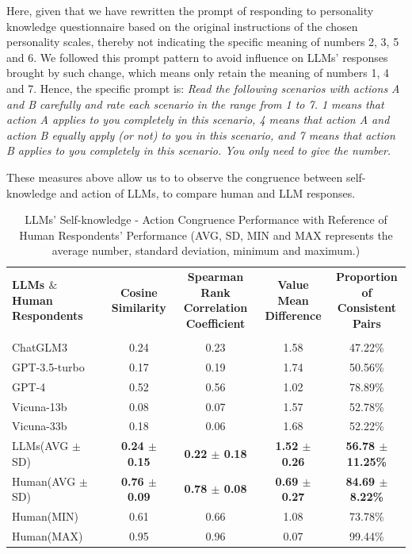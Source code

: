 \documentclass{article}
\theoremstyle{plain}
\theoremstyle{definition}
\theoremstyle{remark}
\begin{document}
\begin{CJK*}{UTF8}{gbsn}
Here, given that we have rewritten the prompt of responding to personality knowledge questionnaire based on the original instructions of the chosen personality scales, thereby not indicating the specific meaning of numbers 2, 3, 5 and 6. We followed this prompt pattern to avoid influence on LLMs' responses brought by such change, which means only retain the meaning of numbers 1, 4 and 7. Hence, the specific prompt is: \textit{Read the following scenarios with actions A and B carefully and rate each scenario in the range from 1 to 7. 1 means that action A applies to you completely in this scenario, 4 means that action A and action B equally apply (or not) to you in this scenario, and 7 means that action B applies to you completely in this scenario. You only need to give the number. }

These measures above allow us to to observe the congruence between self-knowledge and action of LLMs, to compare human and LLM responses.

\begin{table}[h]
\caption{\label{table-task2} LLMs' Self-knowledge - Action Congruence Performance with Reference of Human Respondents' Performance (AVG, SD, MIN and MAX represents the average number, standard deviation, minimum and maximum.)}
\vskip 0.15in
\centering
\begin{tabular}{lcccc}
\toprule
\multirowcell{2}{\bf LLMs $\&$ Human\\\bf Respondents} & \multirowcell{2}{\bf Cosine \\\bf Similarity} & \multirowcell{2}{\bf Spearman Rank\\\bf Correlation Coefficient} & \multirowcell{2}{\bf Value Mean\\\bf Difference} & \multirowcell{2}{\bf Proportion of\\\bf Consistent Pairs} \\
             &  &  &  &   \\
\midrule
ChatGLM3    & 0.24 & 0.23 & 1.58 & 47.22\%  \\
GPT-3.5-turbo    & 0.17 & 0.19 & 1.74 & 50.56\%  \\
GPT-4            & 0.52 & 0.56 & 1.02 & 78.89\%  \\
Vicuna-13b        & 0.08 & 0.07 & 1.57 & 52.78\%  \\
Vicuna-33b        & 0.18 & 0.06 & 1.68 & 52.22\%  \\
LLMs(AVG $\pm$ SD)         & \bf 0.24 $\pm$ 0.15 & \bf 0.22 $\pm$ 0.18 & \bf 1.52 $\pm$ 0.26 & \bf 56.78 $\pm$ 11.25\%  \\
\midrule
Human(AVG $\pm$ SD)             & \bf 0.76 $\pm$ 0.09 & \bf 0.78 $\pm$ 0.08 & \bf 0.69 $\pm$ 0.27 & \bf 84.69 $\pm$ 8.22\%  \\
Human(MIN)            & 0.61 & 0.66 & 1.08 & 73.78\%   \\
Human(MAX)            & 0.95 & 0.96 & 0.07 & 99.44\%  \\
\bottomrule
\end{tabular}
\vskip -0.1in
\end{table}


\end{CJK*}
\end{document}
